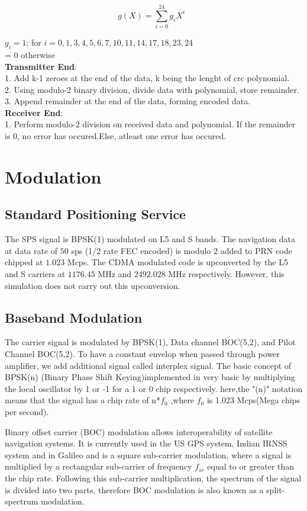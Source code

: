 \begin{equation}
    g(X) = \sum_{i = 0}^{24}g_{i}X^i\;\; 
\end{equation}

    $g_{i}=1$; for $i = 0,1,3,4,5,6,7,10,11,14,17,18,23,24$ \\
          = 0 otherwise
\\
\textbf{Transmitter End}:
\\ 1. Add k-1 zeroes at the end of the data, k being the lenght of crc polynomial.
\\2. Using modulo-2 binary division, divide data with polynomial, store remainder.
\\3. Append remainder at the end of the data, forming encoded data.
\\\textbf{Receiver End}:
\\1. Perform modulo-2 division on received data and polynomial. If the remainder is 0, no error has occured.Else, atleast one error has occured.
\section{Modulation}

\subsection{Standard Positioning Service}
The SPS signal is BPSK(1) modulated on L5 and S bands. The navigation data at data rate of $50$ sps (1/2 rate FEC encoded) is modulo $2$ added to PRN code chipped at $1.023$ Mcps. The CDMA modulated code is upconverted by the L5 and S carriers at $1176.45$ MHz and $2492.028$ MHz respectively. However, this simulation does not carry out this upconversion.

\subsection{Baseband Modulation}
The carrier signal is modulated by BPSK(1), Data channel BOC(5,2), and Pilot Channel BOC(5,2). To have a constant envelop when passed through power amplifier, we add additional signal called interplex signal.
The basic concept of BPSK(n) (Binary Phase Shift Keying)implemented in very basic by multiplying the local oscillator by 1 or -1 for a 1 or 0 chip respectively. here,the "(n)" notation means that the signal has a chip rate of n*$f_0$ ,where $f_0$ is 1.023 Mcps(Mega chips per second).

Binary offset carrier (BOC) modulation allows interoperability of satellite navigation systems. It is currently used in the US GPS system, Indian IRNSS system and in Galileo and is a square sub-carrier modulation, where a signal is multiplied by a rectangular sub-carrier of frequency $f_{sc}$ equal to or greater than the chip rate. Following this sub-carrier multiplication, the spectrum of the signal is divided into two parts, therefore BOC modulation is also known as a split-spectrum modulation. \\


